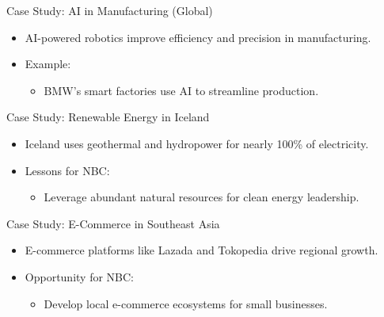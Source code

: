 \documentclass{beamer}
\begin{document}
\begin{frame}{Case Study: AI in Manufacturing (Global)}
    \begin{itemize}
        \item AI-powered robotics improve efficiency and precision in manufacturing.
        \item Example:
        \begin{itemize}
            \item BMW’s smart factories use AI to streamline production.
        \end{itemize}
    \end{itemize}
\end{frame}

\begin{frame}{Case Study: Renewable Energy in Iceland}
    \begin{itemize}
        \item Iceland uses geothermal and hydropower for nearly 100\% of electricity.
        \item Lessons for NBC:
        \begin{itemize}
            \item Leverage abundant natural resources for clean energy leadership.
        \end{itemize}
    \end{itemize}
\end{frame}

\begin{frame}{Case Study: E-Commerce in Southeast Asia}
    \begin{itemize}
        \item E-commerce platforms like Lazada and Tokopedia drive regional growth.
        \item Opportunity for NBC:
        \begin{itemize}
            \item Develop local e-commerce ecosystems for small businesses.
        \end{itemize}
    \end{itemize}
\end{frame}
\end{document}

